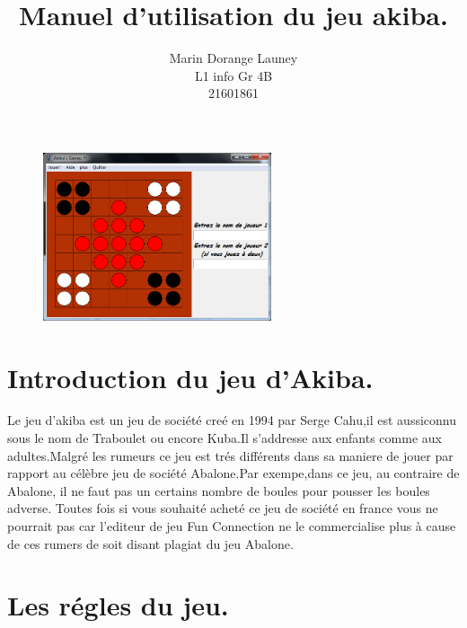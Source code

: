 \documentclass{article}
\title{Manuel d'utilisation du jeu akiba.}
\author{Marin Dorange Launey\\
		L1 info Gr 4B\\
        21601861}
\begin{document}
\maketitle

\begin{figure}[!h]
\centerline{\includegraphics[width=0.6\textwidth]{images/Akiba.png}}
\vspace{1cm}
\caption{}
\end{figure}

\newpage{}
\tableofcontents{}

\newpage{}

\section{Introduction du jeu d'Akiba.}
Le jeu d'akiba est un jeu de société creé en 1994 par Serge Cahu,il est aussiconnu sous le nom de Traboulet ou encore Kuba.Il s'addresse aux enfants comme aux adultes.Malgré les rumeurs ce jeu est trés différents dans sa maniere de jouer par rapport au célèbre jeu de société Abalone.Par exempe,dans ce jeu, au contraire de Abalone, il ne faut pas un certains nombre de boules pour pousser les boules adverse. Toutes fois si vous souhaité acheté ce jeu de société en france vous ne pourrait pas car l'editeur de jeu Fun Connection ne le commercialise plus à cause de ces rumers de soit disant plagiat du jeu Abalone.

\section{Les régles du jeu.}
\end{document}

